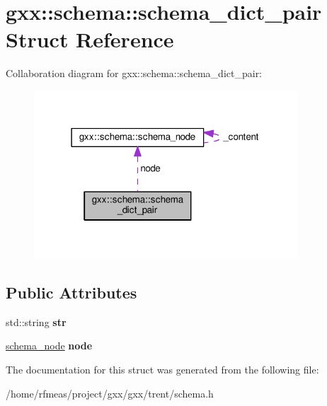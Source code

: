 \hypertarget{structgxx_1_1schema_1_1schema__dict__pair}{}\section{gxx\+:\+:schema\+:\+:schema\+\_\+dict\+\_\+pair Struct Reference}
\label{structgxx_1_1schema_1_1schema__dict__pair}


Collaboration diagram for gxx\+:\+:schema\+:\+:schema\+\_\+dict\+\_\+pair\+:
\nopagebreak
\begin{figure}[H]
\begin{center}
\leavevmode
\includegraphics[width=279pt]{structgxx_1_1schema_1_1schema__dict__pair__coll__graph}
\end{center}
\end{figure}
\subsection*{Public Attributes}
\begin{DoxyCompactItemize}
\item 
std\+::string {\bfseries str}\hypertarget{structgxx_1_1schema_1_1schema__dict__pair_a33fea5ba2b66a44caca6298e0a56f11d}{}\label{structgxx_1_1schema_1_1schema__dict__pair_a33fea5ba2b66a44caca6298e0a56f11d}

\item 
\hyperlink{classgxx_1_1schema_1_1schema__node}{schema\+\_\+node} {\bfseries node}\hypertarget{structgxx_1_1schema_1_1schema__dict__pair_a08294023fb7008e225d03b4ac5e9d710}{}\label{structgxx_1_1schema_1_1schema__dict__pair_a08294023fb7008e225d03b4ac5e9d710}

\end{DoxyCompactItemize}


The documentation for this struct was generated from the following file\+:\begin{DoxyCompactItemize}
\item 
/home/rfmeas/project/gxx/gxx/trent/schema.\+h\end{DoxyCompactItemize}
